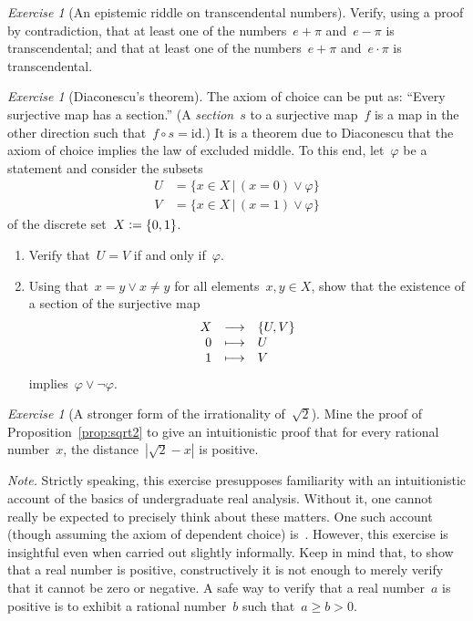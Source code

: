 \documentclass[10pt,reqno,a4paper,openany]{amsbook}
\theoremstyle{definition}
\theoremstyle{plain}
\theoremstyle{remark}
\newcommand{\?}{\,{:}\,}
\renewcommand{\_}{\mathpunct{.}\,}
\newcommand{\defeq}{\vcentcolon=}
\newtheorem{exercise}[defn]{Exercise}
\begin{document}
\begin{exercise}[An epistemic riddle on transcendental numbers]
Verify, using a proof by contradiction, that at least one of the numbers~$e +
\pi$ and~$e - \pi$ is transcendental; and that at least one of the
numbers~$e + \pi$ and~$e \cdot \pi$ is transcendental.
\end{exercise}

\begin{exercise}[Diaconescu's theorem]
\label{ex:diaconescu}
The axiom of choice can be put as: ``Every surjective map has a
section.'' (A \emph{section}~$s$ to a surjective map~$f$ is a map in the other direction such that~$f \circ s =
\mathrm{id}$.) It is a theorem due to Diaconescu that
the axiom of choice implies the law of excluded middle. To this end, let~$\varphi$ be a
statement and consider the subsets
\begin{align*}
  U &= \{ x \in X \,|\, (x = 0) \vee \varphi \} \\
  V &= \{ x \in X \,|\, (x = 1) \vee \varphi \}
\end{align*}
of the discrete set~$X \defeq \{ 0,1 \}$.
\begin{enumerate}
\item Verify that~$U = V$ if and only if~$\varphi$.
\item Using that~$x = y \vee x \neq y$ for all elements~$x,y \in X$, show that
the existence of a section of the surjective map
\[ \begin{array}{@{}rcl@{}}
  X &\longrightarrow& \{U,V\} \\
  0 &\longmapsto& U \\
  1 &\longmapsto& V
\end{array} \]
implies~$\varphi \vee \neg\varphi$.
\end{enumerate}
\end{exercise}

\begin{exercise}[A stronger form of the irrationality of~$\sqrt{2}$]
\label{ex:sqrt2}
Mine the proof of Proposition~\ref{prop:sqrt2} to give an intuitionistic proof
that for every rational number~$x$, the distance~$|\sqrt{2}-x|$ is positive.

{\noindent\scriptsize\emph{Note.} Strictly speaking, this exercise presupposes
familiarity with an intuitionistic account of the basics of undergraduate real
analysis. Without it, one cannot really be expected to precisely think about
these matters. One such account (though assuming the axiom of dependent choice)
is~\cite{bishop-bridges:bible}. However, this exercise is insightful even when carried out
slightly informally. Keep in mind that, to show that a real number is positive,
constructively it is not enough to merely verify that it cannot be zero or
negative. A safe way to verify that a real number~$a$ is positive is to exhibit
a rational number~$b$ such that~$a \geq b > 0$.\par}
\end{exercise}
\end{document}
